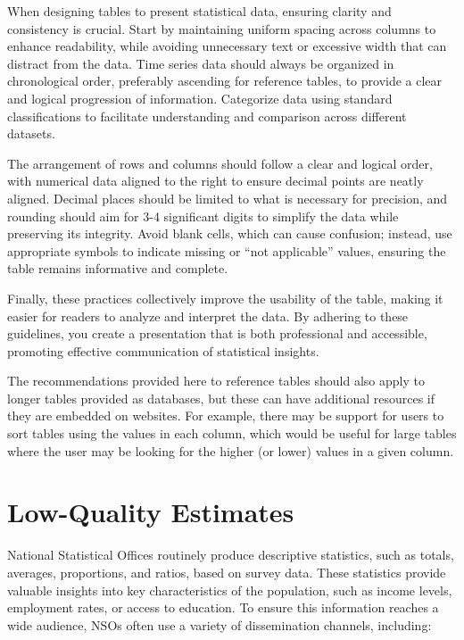 \documentclass[
  12pt,
]{book}
\begin{document}
When designing tables to present statistical data, ensuring clarity and consistency is crucial. Start by maintaining uniform spacing across columns to enhance readability, while avoiding unnecessary text or excessive width that can distract from the data. Time series data should always be organized in chronological order, preferably ascending for reference tables, to provide a clear and logical progression of information. Categorize data using standard classifications to facilitate understanding and comparison across different datasets.

The arrangement of rows and columns should follow a clear and logical order, with numerical data aligned to the right to ensure decimal points are neatly aligned. Decimal places should be limited to what is necessary for precision, and rounding should aim for 3-4 significant digits to simplify the data while preserving its integrity. Avoid blank cells, which can cause confusion; instead, use appropriate symbols to indicate missing or ``not applicable'' values, ensuring the table remains informative and complete.

Finally, these practices collectively improve the usability of the table, making it easier for readers to analyze and interpret the data. By adhering to these guidelines, you create a presentation that is both professional and accessible, promoting effective communication of statistical insights.

The recommendations provided here to reference tables should also apply to longer tables provided as databases, but these can have additional resources if they are embedded on websites. For example, there may be support for users to sort tables using the values in each column, which would be useful for large tables where the user may be looking for the higher (or lower) values in a given column.

\hypertarget{low-quality-estimates}{%
\section{Low-Quality Estimates}\label{low-quality-estimates}}

National Statistical Offices routinely produce descriptive statistics, such as totals, averages, proportions, and ratios, based on survey data. These statistics provide valuable insights into key characteristics of the population, such as income levels, employment rates, or access to education. To ensure this information reaches a wide audience, NSOs often use a variety of dissemination channels, including:
\end{document}
